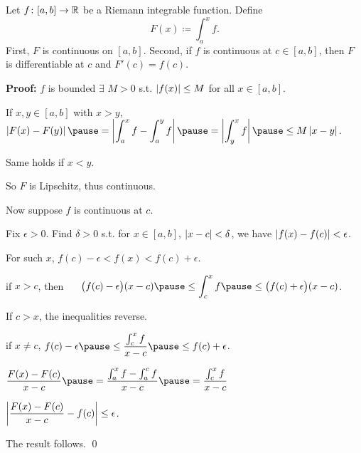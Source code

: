\documentclass[10pt,aspectratio=149]{beamer}
\begin{document}
\begin{frame}

\begin{theorem}
Let $f \colon [a,b] \to {\mathbb{R}}$ be a Riemann integrable function.
\pause
Define
\begin{equation*}
F(x) \coloneqq \int_a^x f .
\end{equation*}
\pause
First, $F$ is continuous on $[a,b]$.
\pause
Second,
if $f$ is continuous at $c \in [a,b]$, then $F$ is differentiable at $c$
and $F'(c) = f(c)$.
\end{theorem}

\pause
\textbf{Proof:}
$f$ is bounded \wthus $\exists$ $M > 0$ s.t.  $\left\lvert {f(x)} \right\rvert \leq M$ for all $x \in [a,b]$.

\pause
\medskip

If
$x,y \in [a,b]$ with $x > y$,
~~
$\displaystyle
\abs{F(x)-F(y)}
\pause
=
\abs{\int_a^x f - \int_a^y f}
\pause
=
\abs{\int_y^x f}
\pause
\leq
M\abs{x-y}$.

\pause
\medskip

Same holds if $x < y$.

\pause
\medskip

So $F$ is Lipschitz, thus continuous.

\end{frame}

\begin{frame}
Now suppose $f$ is continuous at $c$.

\pause
Fix $\epsilon > 0$.
\pause
Find $\delta > 0$ s.t.
for $x \in [a,b]$, $\left\lvert {x-c} \right\rvert < \delta$, we have $\left\lvert {f(x)-f(c)} \right\rvert < \epsilon$.

\pause
For such $x$, \quad
$f(c)-\epsilon < f(x) < f(c) + \epsilon$.

\pause
\medskip

\thus \quad
if $x > c$, then
~~
$\displaystyle
\bigl(f(c)-\epsilon\bigr) (x-c)
\pause
\leq
\int_c^x f
\pause
\leq
\bigl(f(c) + \epsilon\bigr)(x-c)$.

\pause
\medskip

If $c > x$, the inequalities reverse.

\pause
\medskip

\thus \quad if $x \not= c$, \quad
$\displaystyle
f(c)-\epsilon
\pause
\leq
\frac{\int_c^{x} f}{x-c}
\pause
\leq
f(c)+\epsilon$.

\pause
\medskip

$\displaystyle
\frac{F(x)-F(c)}{x-c}
\pause
=
\frac{\int_a^{x} f - \int_a^{c} f}{x-c}
\pause
=
\frac{\int_c^{x} f}{x-c}$

\pause
\medskip

\thus
\quad
$\displaystyle
\left\lvert {\frac{F(x)-F(c)}{x-c} - f(c)} \right\rvert \leq \epsilon$.

\pause
\medskip
The result follows.
\qed
\end{frame}
\end{document}
